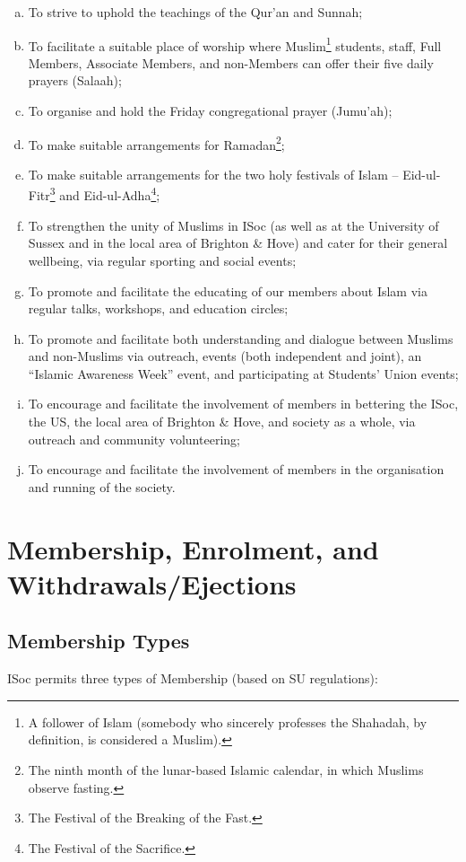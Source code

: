 \documentclass[12pt]{article}
\begin{document}
\begin{displayquote}
\begin{enumerate}[a.]
\item To strive to uphold the teachings of the Qur'an and Sunnah;
\item To facilitate a suitable place of worship where Muslim\footnote{A follower of Islam (somebody who sincerely professes the Shahadah, by definition, is considered a Muslim).} students, staff, Full Members, Associate Members, and non-Members can offer their five daily prayers (Salaah);
\item To organise and hold the Friday congregational prayer (Jumu'ah);
\item To make suitable arrangements for Ramadan\footnote{The ninth month of the lunar-based Islamic calendar, in which Muslims observe fasting.};
\item To make suitable arrangements for the two holy festivals of Islam -- Eid-ul-Fitr\footnote{The Festival of the Breaking of the Fast.} and Eid-ul-Adha\footnote{The Festival of the Sacrifice.};
\item To strengthen the unity of Muslims in ISoc (as well as at the University of Sussex and in the local area of Brighton \& Hove) and cater for their general wellbeing, via regular sporting and social events;
\item To promote and facilitate the educating of our members about Islam via regular talks, workshops, and education circles;
\item To promote and facilitate both understanding and dialogue between Muslims and non-Muslims via outreach, events (both independent and joint), an ``Islamic Awareness Week'' event, and participating at Students' Union events;
\item To encourage and facilitate the involvement of members in bettering the ISoc, the US, the local area of Brighton \& Hove, and society as a whole, via outreach and community volunteering;
\item To encourage and facilitate the involvement of members in the organisation and running of the society.
\end{enumerate}
\end{displayquote}

\section{Membership, Enrolment, and Withdrawals/Ejections}

\subsection{Membership Types}
ISoc permits three types of Membership (based on SU regulations):
\end{document}
